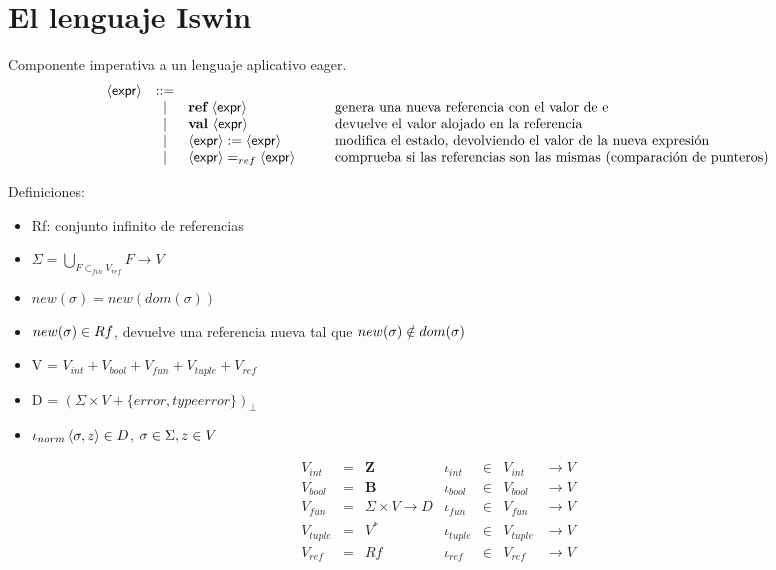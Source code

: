 \section{El lenguaje Iswin}
  \PN Componente imperativa a un lenguaje aplicativo eager.
  \[\begin{array}{rcl@{\hspace{1cm}}l}
    \expr &::=&  \\
      &|& \textbf{ref} \ \expr & \text{genera una nueva referencia con el valor de e} \\
      &|& \textbf{val} \ \expr & \text{devuelve el valor alojado en la referencia} \\
      &|& \expr := \expr & \text{modifica el estado, devolviendo el valor de la nueva expresión} \\
      &|& \expr =_{ref} \expr & \text{comprueba si las referencias son las mismas (comparación de punteros)}
  \end{array}\]

  \PN Definiciones:
  \begin{itemize}
    \item Rf: conjunto infinito de referencias
    \item $\Sigma = \bigcup\limits_{F \subset_{fin} V_{ref}} F \to V$
    \item $new(\sigma) = new(dom(\sigma))$
    \item $new(\sigma) \in Rf$, devuelve una referencia nueva tal que $new(\sigma) \notin dom(\sigma)$
    \item V = $V_{int} + V_{bool} + V_{fun} + V_{tuple} + V_{ref}$
    \item D = $(\Sigma \times V + \{error, typeerror\})_{\bot}$
    \item $\iota_{norm} \left\langle \sigma, z \right\rangle \in D$, $\sigma \in \Sigma, z \in V$
  \end{itemize}

  \vspace{3mm}
  \[\begin{array}{lllllll}
    V_{int} &=& \mathbf{Z} & \iota_{int} &\in& V_{int} & \rightarrow V \\
    V_{bool} &=& \mathbf{B} & \iota_{bool} &\in& V_{bool} & \rightarrow V \\
    V_{fun} &=& \Sigma \times V \rightarrow D & \iota_{fun} &\in& V_{fun} & \rightarrow V \\
    V_{tuple} &=& V^{\ast} & \iota_{tuple} &\in& V_{tuple} & \rightarrow V \\
    V_{ref} &=& Rf & \iota_{ref} &\in& V_{ref} & \rightarrow V
  \end{array}\]

